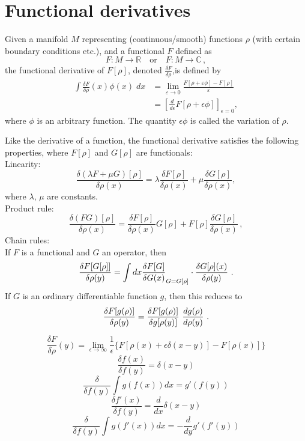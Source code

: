 \documentclass[cyan]{elegantnote}
\begin{document}
\section{Functional derivatives}
\begin{newdef}
Given a manifold $M$ representing (continuous/smooth) functions $\rho$ (with certain boundary conditions etc.), and a functional $F$ defined as
\[F\colon M\rightarrow \mathbb {R} \quad {\mbox{or}}\quad F\colon M\rightarrow \mathbb {C} \,,\]
the functional derivative of $F[\rho]$, denoted $\frac{\delta F}{\delta \rho}$,is defined by
\[{\begin{aligned}\int {\frac {\delta F}{\delta \rho }}(x)\phi (x)\;dx&=\lim _{\varepsilon \to 0}{\frac {F[\rho +\varepsilon \phi ]-F[\rho ]}{\varepsilon }}\\&=\left[{\frac {d}{d\epsilon }}F[\rho +\epsilon \phi ]\right]_{\epsilon =0},\end{aligned}}\]
where $\phi$ is an arbitrary function. The quantity $\epsilon \phi$ is called the variation of $\rho$. 
\end{newdef}

Like the derivative of a function, the functional derivative satisfies the following properties, where $F[\rho]$ and $G[\rho]$ are functionals:\\
Linearity:
\[{\frac {\delta (\lambda F+\mu G)[\rho ]}{\delta \rho (x)}}=\lambda {\frac {\delta F[\rho ]}{\delta \rho (x)}}+\mu {\frac {\delta G[\rho ]}{\delta \rho (x)}},\]
where $\lambda$, $\mu$ are constants.\\
Product rule:
\[{\frac {\delta (FG)[\rho ]}{\delta \rho (x)}}={\frac {\delta F[\rho ]}{\delta \rho (x)}}G[\rho ]+F[\rho ]{\frac {\delta G[\rho ]}{\delta \rho (x)}}\,,\]
Chain rules:\\
If $F$ is a functional and $G$ an operator, then
\[{\displaystyle \displaystyle {\frac {\delta F[G[\rho ]]}{\delta \rho (y)}}=\int dx{\frac {\delta F[G]}{\delta G(x)}}_{G=G[\rho ]}\cdot {\frac {\delta G[\rho ](x)}{\delta \rho (y)}}\ .}\]
If $G$ is an ordinary differentiable function $g$, then this reduces to
\[{\displaystyle \displaystyle {\frac {\delta F[g(\rho )]}{\delta \rho (y)}}={\frac {\delta F[g(\rho )]}{\delta g[\rho (y)]}}\ {\frac {dg(\rho )}{d\rho (y)}}\ .} \]
\begin{newprop}
\[\frac{\delta F}{\delta \rho} (y) = \lim_{\epsilon \to \infty} \frac{1}{\epsilon} \{ F[\rho(x) + \epsilon \delta(x-y)] - F[\rho(x)] \}\]
\[\frac{\delta f(x)}{\delta f(y)} = \delta(x-y)\]
\[\frac{\delta}{\delta f(y)} \int g\left( f(x)\right) dx =  g'(f(y))\]
\[\frac{\delta f'(x)}{\delta f(y)} = \frac{d}{dx}\delta(x-y)\]
\[\frac{\delta}{\delta f(y)} \int g\left( f'(x)\right) dx = -\frac{d}{dy} g'(f'(y))\]
\end{newprop}
\end{document}
